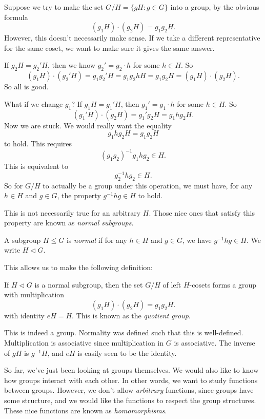 \documentclass[a4paper]{article}
\begin{document}
Suppose we try to make the set $G/H = \{gH: g \in G\}$ into a group, by the obvious formula
\[
  (g_1 H) \cdot (g_2 H) = g_1 g_2 H.
\]
However, this doesn't necessarily make sense. If we take a different representative for the same coset, we want to make sure it gives the same answer.

If $g_2 H = g_2' H$, then we know $g_2' = g_2 \cdot h$ for some $h \in H$. So
\[
  (g_1 H) \cdot (g_2' H) = g_1 g_2' H = g_1 g_2 h H = g_1g_2 H = (g_1 H) \cdot (g_2 H).
\]
So all is good.

What if we change $g_1$? If $g_1H = g_1' H$, then $g_1' = g_1 \cdot h$ for some $h \in H$. So
\[
  (g_1' H) \cdot (g_2 H) = g_1' g_2 H = g_1 h g_2 H.
\]
Now we are stuck. We would really want the equality
\[
  g_1 h g_2 H = g_1 g_2 H
\]
to hold. This requires
\[
  (g_1g_2)^{-1} g_1 h g_2 \in H.
\]
This is equivalent to
\[
  g_2^{-1} h g_2 \in H.
\]
So for $G/H$ to actually be a group under this operation, we must have, for any $h \in H$ and $g \in G$, the property $g^{-1} h g \in H$ to hold.

This is not necessarily true for an arbitrary $H$. Those nice ones that satisfy this property are known as \emph{normal subgroups}.
\begin{defi}
  A subgroup $H \leq G$ is \emph{normal} if for any $h \in H$ and $g \in G$, we have $g^{-1}h g \in H$. We write $H \lhd G$.
\end{defi}

This allows us to make the following definition:
\begin{defi}
  If $H \lhd G$ is a normal subgroup, then the set $G/H$ of left $H$-cosets forms a group with multiplication
  \[
    (g_1 H) \cdot (g_2 H) = g_1 g_2 H.
  \]
  with identity $eH = H$. This is known as the \emph{quotient group}.
\end{defi}
This is indeed a group. Normality was defined such that this is well-defined. Multiplication is associative since multiplication in $G$ is associative. The inverse of $gH$ is $g^{-1}H$, and $eH$ is easily seen to be the identity.

So far, we've just been looking at groups themselves. We would also like to know how groups interact with each other. In other words, we want to study functions between groups. However, we don't allow \emph{arbitrary} functions, since groups have some structure, and we would like the functions to respect the group structures. These nice functions are known as \emph{homomorphisms}.
\end{document}
